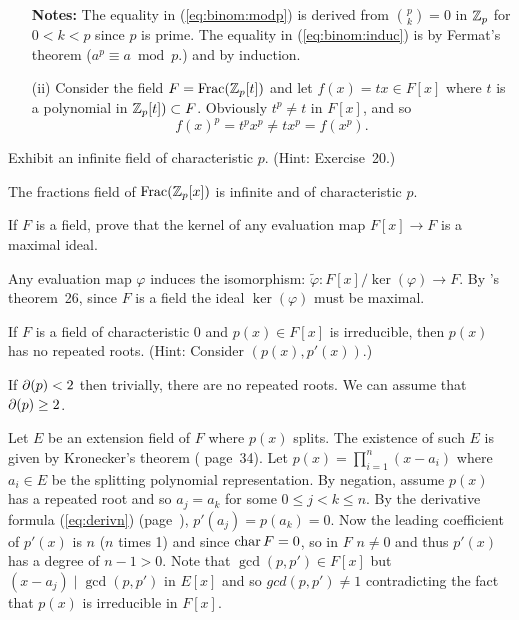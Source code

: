 \begin{myenumerate}
\begin{itemize}
   \textbf{Notes:}
   The equality in (\ref{eq:binom:modp}) is derived
   from \(\binom{p}{k}=0\) in \(\mathbb{Z}_p\) for \(0<k<p\) since $p$ is prime.
   The equality in (\ref{eq:binom:induc}) is by Fermat's theorem
   (\(a^p\equiv a \bmod p\).) and by induction.

 \item[(ii)]
   Consider the field \(F=\mathop{\rm Frac}\nolimits(\mathbb{Z}_p[t])\) and let
  \(f(x)=tx\in F[x]\) where $t$ is a polynomial in \(\mathbb{Z}_p[t]) \subset F\).
  Obviously \(t^p \neq t\) in \(F[x]\), and so
  \[f(x)^p = t^px^p \neq tx^p = f(x^p).\]
\end{itemize}

\item
\begin{excopy}
Exhibit an infinite field of characteristic $p$. (Hint: Exercise~20.)
\end{excopy}

The fractions field of \(\mathop{\rm Frac}\nolimits(\mathbb{Z}_p[x])\) is infinite and of characteristic $p$.

\item
\begin{excopy}
If $F$ is a field, prove that the kernel of any evaluation map
\(F[x]\rightarrow F\) is a maximal ideal.
\end{excopy}

Any evaluation map \(\varphi\) induces the isomorphism:
\(\tilde{\varphi}: F[x]/\ker(\varphi) \rightarrow F\).
By \cite{Rotman98}'s theorem~26,
since $F$ is a field the ideal \(\ker(\varphi)\) must be maximal.

\item
\begin{excopy}
If $F$ is a field of characteristic $0$ and \(p(x)\in F[x]\) is irreducible,
then \(p(x)\) has no repeated roots. (Hint: Consider \((p(x),p'(x))\).)
\end{excopy}

If \(\partial(p)<2\) then trivially, there are no repeated roots.
We can assume that \(\partial(p)\geq 2\).

Let $E$ be an extension field of $F$ where \(p(x)\) splits.
The existence of such $E$ is given by
Kronecker's theorem
(\cite{Rotman98} page~34).
Let
\(p(x)=\prod_{i=1}^n(x-a_i)\) where \(a_i\in E\) be the splitting polynomial
representation.
By negation, assume \(p(x)\) has a repeated root and
so \(a_j=a_k\) for some \(0\leq j < k \leq n\).
By the derivative formula (\ref{eq:derivn}) (page~\pageref{eq:derivn}),
\(p'(a_j)=p(a_k)=0\). Now the leading coefficient of \(p'(x)\)
is $n$ ($n$ times 1) and since \(\mathop{\rm char}\nolimits F=0\), so in $F$ \(n\neq 0\)
and thus \(p'(x)\) has a degree of \(n-1>0\).
Note that \(\gcd(p,p')\in F[x]\) but \((x-a_j)\mid\gcd(p,p')\) in \(E[x]\)
and so \(gcd(p,p')\neq 1\) contradicting the fact that \(p(x)\)
is irreducible in \(F[x]\).


\end{myenumerate}
